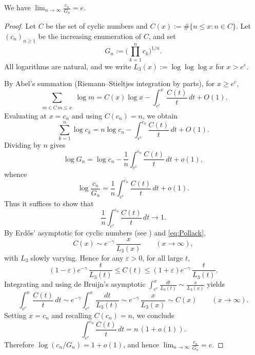 \begin{theorem}\label{thm:vrba}
We have $\displaystyle \lim_{n\to\infty} \frac{c_n}{G_n}=e$.
\end{theorem}

\begin{proof}
Let $C$ be the set of cyclic numbers and $C(x):=\#\{n\le x:n\in C\}$. Let $(c_n)_{n\ge1}$ be the increasing enumeration of $C$, and set
\[
 G_n:=\Big(\prod_{k=1}^n c_k\Big)^{1/n}.
\]
All logarithms are natural, and we write $L_3(x):=\log\log\log x$ for $x>e^e$.

By Abel's summation (Riemann--Stieltjes integration by parts), for $x\ge e^e$,
\[
 \sum_{\substack{m\in C\ m\le x}} \log m 
 = C(x)\log x - \int_{e^e}^x \frac{C(t)}{t}\,dt + O(1).
\]
Evaluating at $x=c_n$ and using $C(c_n)=n$, we obtain
\[
 \sum_{k=1}^n \log c_k 
 = n\log c_n - \int_{e^e}^{c_n} \frac{C(t)}{t}\,dt + O(1).
\]
Dividing by $n$ gives
\[
 \log G_n = \log c_n - \frac1n\int_{e^e}^{c_n} \frac{C(t)}{t}\,dt + o(1),
\]
whence
\[
 \log\frac{c_n}{G_n} = \frac1n\int_{e^e}^{c_n} \frac{C(t)}{t}\,dt + o(1).
\]
Thus it suffices to show that
\[
 \frac1n\int_{e^e}^{c_n} \frac{C(t)}{t}\,dt \to 1.
\]
By Erd\H{o}s' asymptotic for cyclic numbers (see \cite{Pollack2022}) and \eqref{eq:Pollack},
\[
 C(x) \sim e^{-\gamma}\,\frac{x}{L_3(x)} \qquad (x\to\infty),
\]
with $L_3$ slowly varying. Hence for any $\varepsilon>0$, for all large $t$,
\[
 (1-\varepsilon)e^{-\gamma}\,\frac{t}{L_3(t)} \le C(t) \le (1+\varepsilon)e^{-\gamma}\,\frac{t}{L_3(t)}.
\]
Integrating and using de Bruijn's asymptotic $\int_{e^e}^x \!\frac{dt}{L_3(t)}\sim \frac{x}{L_3(x)}$ \cite{deBruijn1970} yields
\[
 \int_{e^e}^x \frac{C(t)}{t}\,dt \sim e^{-\gamma}\int_{e^e}^x \frac{dt}{L_3(t)} \sim e^{-\gamma}\,\frac{x}{L_3(x)} \sim C(x) \qquad (x\to\infty).
\]
Setting $x=c_n$ and recalling $C(c_n)=n$, we conclude
\[
 \int_{e^e}^{c_n} \frac{C(t)}{t}\,dt = n\,(1+o(1)).
\]
Therefore $\log(c_n/G_n)=1+o(1)$, and hence $\displaystyle \lim_{n\to\infty} \frac{c_n}{G_n} = e$.
\end{proof}
